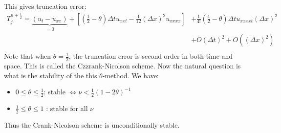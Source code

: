 \documentclass[../main/main.tex]{subfiles}
\begin{document}
This gives truncation error: 
\begin{align*} 
    T_j^{n+\frac{1}{2}} = \underbrace{\left( u_t - u_{x x} \right)}_{=0} + \left[(\frac{1}{2}-\theta) \Delta t u_{xx t} - \frac{1}{12} \left( \Delta x \right) ^2 u_{x x x x}\right] &+ \frac{1}{4!}\left( \frac{1}{2}-\theta \right) \Delta t u_{x x x x t}(\Delta x)^2 \\
    &+ O(\Delta t)^2 + O((\Delta x)^2) \\
\end{align*}
Note that when $\theta=\frac{1}{2}$, the truncation error is second order in both time and space. This is called the Czzrank-Nicolson scheme.
Now the natural question is what is the stability of the this $\theta$-method.
We have: 
\begin{itemize}
    \item $0\le \theta \le  \frac{1}{2}$: stable $ \iff \nu < \frac{1}{2}(1-2\theta)^{-1}$
    \item $\frac{1}{2} \le  \theta \le  1$ : stable for all $\nu$
\end{itemize}
Thus the Crank-Nicolson scheme is unconditionally stable.
\end{document}
